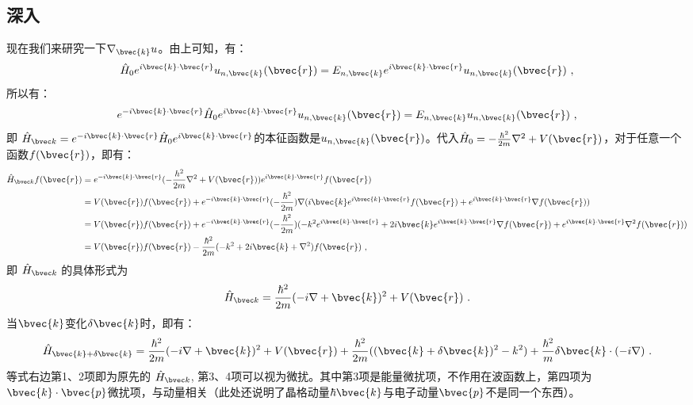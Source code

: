 \subsection{深入}
现在我们来研究一下$\nabla_{\bvec{k}} u$。由上可知，有：
\begin{equation}
\hat H_0 e^{i\bvec{k}\cdot\bvec{r}}u_{n,\bvec{k}}(\bvec{r})
=E_{n,\bvec{k}}e^{i\bvec{k}\cdot\bvec{r}}u_{n,\bvec{k}}(\bvec{r})~,
\end{equation}
所以有：
\begin{equation}\label{eq_anHe_1}
e^{-i\bvec{k}\cdot\bvec{r}} \hat H_0 e^{i\bvec{k}\cdot\bvec{r}}u_{n,\bvec{k}}(\bvec{r})
=E_{n,\bvec{k}}u_{n,\bvec{k}}(\bvec{r})~,
\end{equation}
即 $\hat H_{\bvec k} =e^{-i\bvec{k}\cdot\bvec{r}} \hat H_0 e^{i\bvec{k}\cdot\bvec{r}}$的本征函数是$u_{n,\bvec{k}}(\bvec{r})$。代入$\hat H_0 =-\frac{\hbar^2}{2m}\nabla^2+V(\bvec{r})$，对于任意一个函数$f(\bvec{r})$，即有：
\begin{equation}
\begin{aligned}
\hat H_{\bvec k} f(\bvec{r})&=e^{-i\bvec{k}\cdot\bvec{r}}(-\frac{h^2}{2m}\nabla^2+V(\bvec{r}))e^{i\bvec{k}\cdot\bvec{r}}f(\bvec{r})\\
&=V(\bvec{r})f(\bvec{r})+e^{-i\bvec{k}\cdot\bvec{r}}(-\frac{\hbar^2}{2m})\nabla(i\bvec{k}e^{i\bvec{k}\cdot\bvec{r}}f(\bvec{r})+e^{i\bvec{k}\cdot\bvec{r}}\nabla f(\bvec{r}))\\
&=V(\bvec{r})f(\bvec{r})+e^{-i\bvec{k}\cdot\bvec{r}}(-\frac{\hbar^2}{2m})(-k^2e^{i\bvec{k}\cdot\bvec{r}}+2i\bvec{k}e^{i\bvec{k}\cdot\bvec{r}}\nabla f(\bvec{r})+e^{i\bvec{k}\cdot\bvec{r}}\nabla^2 f(\bvec{r}))\\
&=V(\bvec{r})f(\bvec{r})-\frac{\hbar^2}{2m}(-k^2+2i\bvec{k}+\nabla^2)f(\bvec{r})~,
\end{aligned}
\end{equation}
即 $\hat H_{\bvec k}$ 的具体形式为
\begin{equation}
\hat H_{\bvec k} =\frac{\hbar^2}{2m}(-i\nabla+\bvec{k})^2+V(\bvec{r})~.
\end{equation}
当$\bvec{k}$变化$\delta\bvec{k}$时，即有：
\begin{equation}
\hat H_{\bvec{k}+\delta\bvec{k}} =\frac{\hbar^2}{2m}(-i\nabla+\bvec{k})^2+V(\bvec{r})+\frac{\hbar^2}{2m}((\bvec{k}+\delta{\bvec{k}})^2-k^2)+\frac{\hbar^2}{m}\delta\bvec{k}\cdot(-i\nabla)~.
\end{equation}
等式右边第1、2项即为原先的 $\hat H_{\bvec k}$, 第3、4项可以视为微扰。其中第3项是能量微扰项，不作用在波函数上，第四项为$\bvec{k}\cdot\bvec{p}$微扰项，与动量相关（此处还说明了晶格动量$\hbar\bvec{k}$与电子动量$\bvec{p}$不是同一个东西）。

